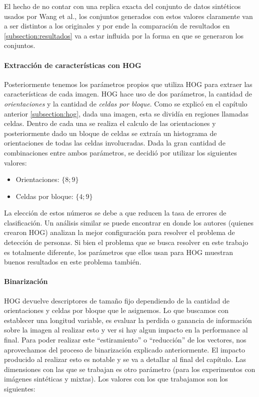 	El hecho de no contar con una replica exacta del conjunto de datos sintéticos usados por Wang et al., los conjuntos generados con estos valores claramente van a ser distintos a los originales y por ende la comparación de resultados  en \ref{subsection:resultados} va a estar influida por la forma en que se generaron los conjuntos.
	
	\paragraph{Extracción de características con HOG}

	Posteriormente tenemos los parámetros propios que utiliza HOG para extraer las características de cada imagen. HOG hace uso de dos parámetros, la cantidad de \textit{orientaciones} y la cantidad de \textit{celdas por bloque}. Como se explicó en el capítulo anterior \ref{subsection:hog}, dada una imagen, esta se dividía en regiones llamadas celdas. Dentro de cada una se realiza el calculo de las orientaciones y posteriormente dado un bloque de celdas se extraía un histograma de orientaciones de todas las celdas involucradas. Dada la gran cantidad de combinaciones entre ambos parámetros, se decidió por utilizar los siguientes valores:
	
	\begin{itemize}
		\item Orientaciones: $\{8; 9\}$
		\item Celdas por bloque: $\{4; 9\}$
	\end{itemize}
	
	La elección de estos números se debe a que reducen la tasa de errores de clasificación. Un análisis similar se puede encontrar en \cite{DT05} donde los autores (quienes crearon HOG) analizan la mejor configuración para resolver el problema de detección de personas. Si bien el problema que se busca resolver en este trabajo es totalmente diferente, los parámetros que ellos usan para HOG muestran buenos resultados en este problema también.

	\paragraph{Binarización}

	HOG devuelve descriptores de tamaño fijo dependiendo de la cantidad de orientaciones y celdas por bloque que le asignemos. Lo que buscamos con establecer una longitud variable, es evaluar la perdida o ganancia de información sobre la imagen al realizar esto y ver si hay algun impacto en la performance al final. Para poder realizar este ``estiramiento'' o ``reducción'' de los vectores, nos aprovechamos del proceso de binarización explicado anteriormente. El impacto producido al realizar esto es notable y se va a detallar al final del capítulo. Las dimensiones con las que se trabajan es otro parámetro (para los experimentos con imágenes sintéticas y mixtas). Los valores con los que trabajamos son los siguientes:


